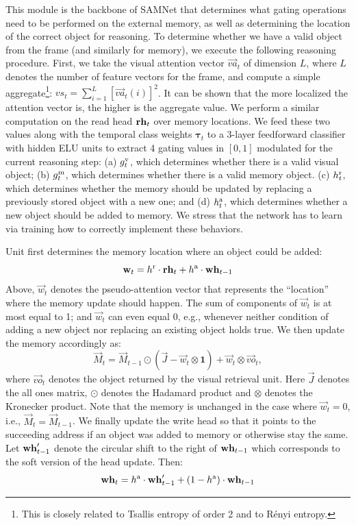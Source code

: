 This module is the backbone of SAMNet that determines what gating operations need to be performed on the external memory, as well as
determining the location of the correct object for reasoning.
To determine whether we have a valid object from the frame (and similarly for memory), we execute the following reasoning procedure.
First, we take the visual attention vector $\vec{va}_t$ of dimension $L$, where $L$ denotes the number of feature vectors for the frame,
and compute a simple aggregate\footnote{%
	This is closely related to Tsallis entropy of order 2 and to R\'{e}nyi entropy.}: %
$vs_t = \sum_{i=1}^L [\vec{va}_t(i)]^2$. It can be shown that the more localized the attention
vector is, the higher is the aggregate value.
We perform a similar computation on the read head $\mathbf{rh}_t$ over memory locations.
We feed these two values along with the temporal class weights $\bm{\tau}_t$ to a 3-layer feedforward classifier with hidden ELU units to extract 4 gating values
in $[0,1]$ modulated for the current reasoning step:
(a) $g^{\mathrm{v}}_t$, which determines whether there is a valid visual object;
(b) $g^{\mathrm{m}}_t$, which determines whether there is a valid memory object. 
(c) $h^{\mathrm{r}}_t$, which determines whether the memory should be updated by replacing a previously stored object with a new one; and
(d) $h^{\mathrm{a}}_t$, which determines whether a new object should be added to memory.
We stress that the network has to learn via training how to correctly implement these behaviors.

Unit first determines the memory location where an object could be added:
\[ \mathbf{w}_t = h^{\mathrm{r}} \cdot \mathbf{rh}_t + h^{\mathrm{a}} \cdot \mathbf{wh}_{t-1} \]
Above, $\vec{w}_t$ denotes the pseudo-attention vector that represents the ``location'' where the memory update should happen.
The sum of components of $\vec{w}_t$ is at most equal to 1; and $\vec{w}_t$ can even equal 0, e.g., whenever neither condition
of adding a new object nor replacing an existing object holds true.
We then update the memory accordingly as:
\[ \vec{M}_t = \vec{M}_{t-1} \odot (\vec{J} - \vec{w}_t  \otimes \mathbf{1}) + \vec{w}_t  \otimes \vec{vo}_t,\]
where $\vec{vo}_t$ denotes the object returned by the visual retrieval unit. 
Here $\vec{J}$ denotes the all ones matrix, $\odot$ denotes the Hadamard product and $\otimes$ denotes the Kronecker product. 
Note that the memory is unchanged in the case where $\vec{w}_t = 0$, i.e., $\vec{M}_t = \vec{M}_{t-1}$.
We finally update the write head so that it points to the succeeding address if an object was added to memory or otherwise stay the same.
Let $\mathbf{wh}'_{t-1}$ denote the circular shift to the right of $\mathbf{wh}_{t-1}$ which corresponds to the soft version of the head update.
Then:
\[ \mathbf{wh}_t = h^{\mathrm{a}} \cdot \mathbf{wh}'_{t-1} + (1-h^{\mathrm{a}}) \cdot \mathbf{wh}_{t-1} \]

